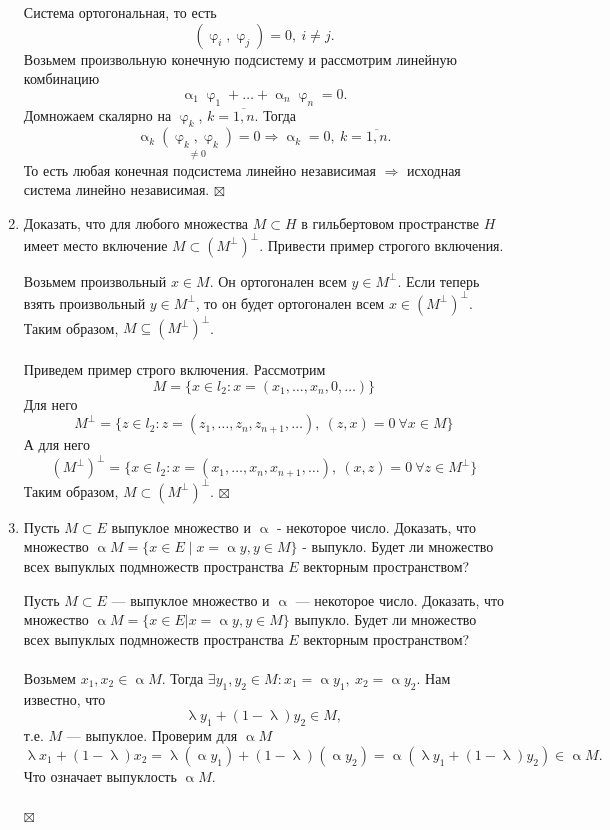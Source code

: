 \documentclass[a4paper, 12pt]{report}
\newenvironment{Proof} %
{\par\noindent{$\blacklozenge$}} %
{\hfill$\scriptstyle\boxtimes$}
\renewcommand{\alpha}{\upalpha}
\renewcommand{\varphi}{\upvarphi}
\renewcommand{\lambda}{\uplambda}
\begin{document}
\begin{enumerate}
\begin{Proof}
		Система ортогональная, то есть $$(\varphi_i, \varphi_j) = 0,\ i\ne j.$$
		Возьмем произвольную конечную подсистему и рассмотрим линейную комбинацию $$\alpha_1 \varphi_1 + \ldots + \alpha_n \varphi_n = 0.$$
		Домножаем скалярно на $\varphi_k$, $k=\overline{1,n}$. Тогда $$\alpha_k\underset{\ne 0}{(\varphi_k,\varphi_k)} = 0 \Rightarrow \alpha_k = 0,\ k =\overline{1,n}.$$
		То есть любая конечная подсистема линейно независимая $\Rightarrow$ исходная система линейно независимая.
		\end{Proof}
		\item Доказать, что для любого множества $M \subset H$ в гильбертовом пространстве $H$ имеет место включение $M \subset\left(M^{\perp}\right)^{\perp}$. Привести пример строгого включения.
		\begin{Proof}
			Возьмем произвольный $x \in M$. Он ортогонален всем $y \in M^\perp$. Если теперь взять произвольный $y \in M^\perp$, то он будет ортогонален всем $x \in (M^\perp)^\perp$. Таким образом, $M \subseteq (M^\perp)^\perp$.\\\\
		Приведем пример строго включения. Рассмотрим $$M = \{x \in l_2 : x = (x_1,\ldots, x_n, 0,\ldots)\}$$
		Для него $$M^\perp = \{z \in l_2 : z = (z_1,\ldots, z_n, z_{n+1},\ldots),\ (z,x) = 0\ \forall x \in M\}$$
		А для него $$(M^\perp)^\perp = \{x \in l_2 : x = (x_1,\ldots, x_n, x_{n+1},\ldots),\ (x,z) = 0\ \forall z \in M^\perp\}$$
		Таким образом, $M \subset (M^\perp)^\perp$.
		\end{Proof}
		\item Пусть $M \subset E$ выпуклое множество и $\alpha$ - некоторое число. Доказать, что множество $\alpha M=\{x \in E \mid x=\alpha y, y \in M\}$ - выпукло. Будет ли множество всех выпуклых подмножеств пространства $E$ векторным пространством?
		\begin{Proof}
			Пусть $M\subset E$ --- выпуклое множество и $\alpha$ --- некоторое число. Доказать, что множество $\alpha M = \{x \in E | x = \alpha y, y \in M\}$ выпукло. Будет ли множество всех выпуклых подмножеств пространства $E$ векторным пространством?\\\\
		Возьмем $x_1, x_2 \in \alpha M$. Тогда $\exists y_1, y_2 \in M : x_1 = \alpha y_1,\ x_2 = \alpha y_2$.
		Нам известно, что $$\lambda y_1 + (1-\lambda)y_2 \in M,$$ т.е. $M$ --- выпуклое. Проверим для $\alpha M$ $$\lambda x_1 + (1-\lambda)x_2 = \lambda(\alpha y_1) + (1-\lambda)(\alpha y_2) = \alpha( \lambda y_1 + (1-\lambda)y_2)\in \alpha M.$$
		Что означает выпуклость $\alpha M$.\\\\

\end{Proof}
\end{enumerate}
\end{document}
